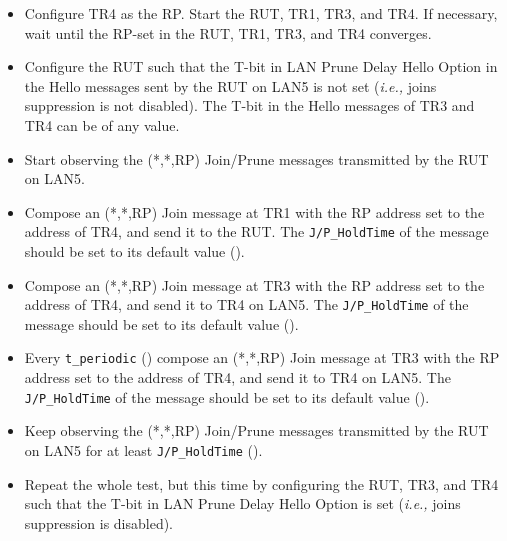 \documentclass[11pt]{report}
\newcommand{\ie}{\emph{i.e.,}\xspace}
\begin{document}
\begin{itemize}

  \item Configure TR4 as the RP. Start the RUT, TR1, TR3, and TR4. If
  necessary, wait until the RP-set in the RUT, TR1, TR3, and TR4
  converges.

  \item Configure the RUT such that the T-bit in LAN Prune Delay Hello
  Option in the Hello messages sent by the RUT on LAN5 is not set (\ie joins
  suppression is not disabled). The T-bit in the Hello messages of TR3 and TR4
  can be of any value.

  \item Start observing the (*,*,RP) Join/Prune messages transmitted by the
  RUT on LAN5.

  \item Compose an (*,*,RP) Join message at TR1 with the RP address set to the
  address of TR4, and send it to the RUT. 
  The \verb=J/P_HoldTime= of the message should be set to its default
  value ({\PimsmJPHoldTime}).

  \item Compose an (*,*,RP) Join message at TR3 with the RP address set to the
  address of TR4, and send it to TR4 on LAN5.
  The \verb=J/P_HoldTime= of the message should be set to its default
  value ({\PimsmJPHoldTime}).

  \item Every \verb=t_periodic= ({\PimsmTPeriodic}) compose an (*,*,RP) Join
  message at TR3 with the RP address set to the address of TR4, and send it to
  TR4 on LAN5.
  The \verb=J/P_HoldTime= of the message should be set to its default
  value ({\PimsmJPHoldTime}).

  \item Keep observing the (*,*,RP) Join/Prune messages transmitted by the
  RUT on LAN5 for at least \verb=J/P_HoldTime= ({\PimsmJPHoldTime}).

  \item Repeat the whole test, but this time by configuring the RUT, TR3, and
  TR4 such that the T-bit in LAN Prune Delay Hello Option is set (\ie joins
  suppression is disabled).

\end{itemize}

\end{document}
